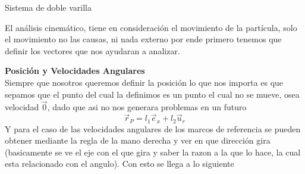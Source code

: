 \begin{solucion}{Sistema de doble varilla}
\begin{center}
\end{center}
El análisis cinemático, tiene en consideración el movimiento de la partícula, solo el movimiento no las causas, ni nada externo por ende primero tenemos que definir los vectores que nos ayudaran a analizar.

        
\textbf{Posición y Velocidades Angulares}\\
        Siempre que nosotros queremos definir la posición lo que nos importa es que sepamos que el punto del cual la definimos es un punto el cual no se mueve, osea velocidad $\vec{0}$, dado que asi no nos generara problemas en un futuro
        \begin{equation*}
            \vec{r}_P=l_1\vec{e}_x+l_2\vec{u}_r 
        \end{equation*}
        Y para el caso de las velocidades angulares de los marcos de referencia se pueden obtener mediante la regla de la mano derecha y ver en que dirección gira (basicamente se ve el eje con el que gira y saber la razon a la que lo hace, la cual esta relacionado con el angulo). Con esto se llega a lo siguiente
        

\end{solucion}
